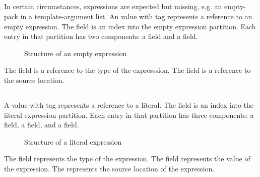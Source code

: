
\subsection{}
\label{sec:ifc:ExprSort:Empty}

In certain circumstances, expressions are expected but missing, e.g. an empty-pack in a template-argument list.
An  value with tag  represents a reference to an empty expression.
The  field is an index into the empty expression partition.
Each entry in that partition has two components: a  field and a  field.
%
\begin{figure}[H]
	\centering
	\caption{Structure of an empty expression}
	\label{fig:ifc-empty-expression-structure}
\end{figure}
%
The  field is a reference to the type of the expresssion.
The  field is a reference to the source location.


\subsection{}
\label{sec:ifc:ExprSort:Literal}

A  value with tag  represents a reference to a literal.
The  field is an index into the literal expression partition.
Each entry in that partition has three components: a  field, a  field, and a  field.
%
\begin{figure}[H]
	\centering
	\caption{Structure of a literal expression}
	\label{fig:ifc-literal-expr-structure}
\end{figure}
%
The  field represents the type of the expression.
The  field represents the value of the expression.
The  represents the source location of the expression.

